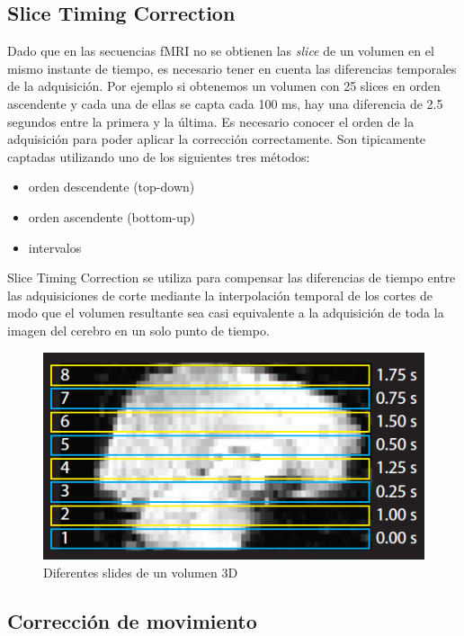 \subsection{Slice Timing Correction}

Dado que en las secuencias fMRI no se obtienen las \textit{slice} de un volumen en el mismo instante de tiempo, es necesario tener en cuenta las diferencias temporales de la adquisición. Por ejemplo si obtenemos un volumen con 25 slices en orden ascendente y cada una de ellas se capta cada 100 ms, hay una diferencia de 2.5 segundos entre la primera y la última. Es necesario conocer el orden de la adquisición para poder aplicar la corrección correctamente. Son tipicamente captadas utilizando uno de los siguientes tres métodos:
\begin{itemize}
	\item orden descendente (top-down)
	\item orden ascendente (bottom-up)
	\item intervalos
\end{itemize}

Slice Timing Correction se utiliza para compensar las diferencias de tiempo entre las adquisiciones de corte mediante la interpolación temporal de los cortes de modo que el volumen resultante sea casi equivalente a la adquisición de toda la imagen del cerebro en un solo punto de tiempo.


\begin{figure}[H]
  \centering
    \includegraphics[scale=0.5]{img/slice_timming.png}
  \caption{Diferentes slides de un volumen 3D}         \label{preproc:slice_timming}
\end{figure}

\subsection{Corrección de movimiento}

